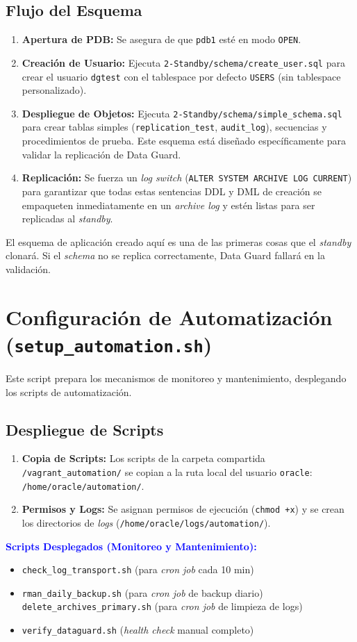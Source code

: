 \documentclass[11pt, a4paper]{report}
\newcommand{\destacado}[1]{\textbf{\textcolor{blue}{#1}}}
\begin{document}
\subsection{Flujo del Esquema}
\begin{enumerate}
    \item \textbf{Apertura de PDB:} Se asegura de que \texttt{pdb1} esté en modo \texttt{OPEN}.
\item \textbf{Creación de Usuario:} Ejecuta \texttt{2-Standby/schema/create\_user.sql} para crear el usuario \texttt{dgtest} con el tablespace por defecto \texttt{USERS} (sin tablespace personalizado).
\item \textbf{Despliegue de Objetos:} Ejecuta \texttt{2-Standby/schema/simple\_schema.sql} para crear tablas simples (\texttt{replication\_test}, \texttt{audit\_log}), secuencias y procedimientos de prueba. Este esquema está diseñado específicamente para validar la replicación de Data Guard.
\item \textbf{Replicación:} Se fuerza un \textit{log switch} (\texttt{ALTER SYSTEM ARCHIVE LOG CURRENT}) para garantizar que todas estas sentencias DDL y DML de creación se empaqueten inmediatamente en un \textit{archive log} y estén listas para ser replicadas al \textit{standby}.
\end{enumerate}
El esquema de aplicación creado aquí es una de las primeras cosas que el \textit{standby} clonará. Si el \textit{schema} no se replica correctamente, Data Guard fallará en la validación.

\section{Configuración de Automatización (\texttt{setup\_automation.sh})}

Este script prepara los mecanismos de monitoreo y mantenimiento, desplegando los scripts de automatización.
\subsection{Despliegue de Scripts}
\begin{enumerate}
    \item \textbf{Copia de Scripts:} Los scripts de la carpeta compartida \texttt{/vagrant\_automation/} se copian a la ruta local del usuario \texttt{oracle}: \texttt{/home/oracle/automation/}.
\item \textbf{Permisos y Logs:} Se asignan permisos de ejecución (\texttt{chmod +x}) y se crean los directorios de \textit{logs} (\texttt{/home/oracle/logs/automation/}).
\end{enumerate}
\destacado{Scripts Desplegados (Monitoreo y Mantenimiento):}
\begin{itemize}
    \item \texttt{check\_log\_transport.sh} (para \textit{cron job} cada 10 min)
    \item \texttt{rman\_daily\_backup.sh} (para \textit{cron job} de backup diario)
    \texttt{delete\_archives\_primary.sh} (para \textit{cron job} de limpieza de logs)
    \item \texttt{verify\_dataguard.sh} (\textit{health check} manual completo)
\end{itemize}
\end{document}
